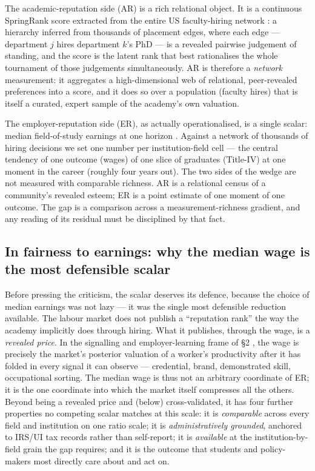 \documentclass[11pt]{article}
\begin{document}
The academic-reputation side (AR) is a rich relational object. It is a continuous SpringRank score \citep{debacco2018physical} extracted from the entire US faculty-hiring network \citep{wapman2022quantifying}: a hierarchy inferred from thousands of placement edges, where each edge --- department $j$ hires department $k$'s PhD --- is a revealed pairwise judgement of standing, and the score is the latent rank that best rationalises the whole tournament of those judgements simultaneously. AR is therefore a \emph{network} measurement: it aggregates a high-dimensional web of relational, peer-revealed preferences into a score, and it does so over a population (faculty hires) that is itself a curated, expert sample of the academy's own valuation.

The employer-reputation side (ER), as actually operationalised, is a single scalar: median field-of-study earnings at one horizon \citep{scorecard}. Against a network of thousands of hiring decisions we set one number per institution-field cell --- the central tendency of one outcome (wages) of one slice of graduates (Title-IV) at one moment in the career (roughly four years out). The two sides of the wedge are not measured with comparable richness. AR is a relational census of a community's revealed esteem; ER is a point estimate of one moment of one outcome. The gap is a comparison across a measurement-richness gradient, and any reading of its residual must be disciplined by that fact.

\subsection{In fairness to earnings: why the median wage is the most defensible scalar}

Before pressing the criticism, the scalar deserves its defence, because the choice of median earnings was not lazy --- it was the single most defensible reduction available. The labour market does not publish a ``reputation rank'' the way the academy implicitly does through hiring. What it publishes, through the wage, is a \emph{revealed price}. In the signalling and employer-learning frame of \S2 \citep{spence1973job, altonji2001employer}, the wage is precisely the market's posterior valuation of a worker's productivity after it has folded in every signal it can observe --- credential, brand, demonstrated skill, occupational sorting. The median wage is thus not an arbitrary coordinate of ER; it is the one coordinate into which the market itself compresses all the others. Beyond being a revealed price and (below) cross-validated, it has four further properties no competing scalar matches at this scale: it is \emph{comparable} across every field and institution on one ratio scale; it is \emph{administratively grounded}, anchored to IRS/UI tax records rather than self-report; it is \emph{available} at the institution-by-field grain the gap requires; and it is the outcome that students and policy-makers most directly care about and act on.
\end{document}
